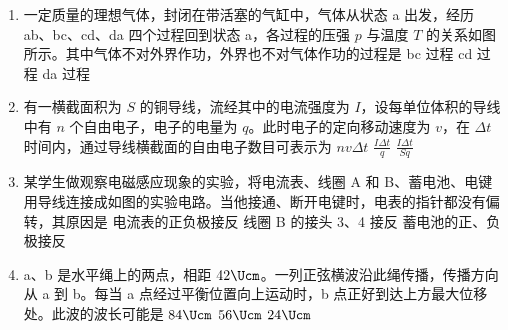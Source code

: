 \documentclass[\gkver]{gaokaozhenti}
\begin{document}
\begin{enumerate}
\item
一定质量的理想气体，封闭在带活塞的气缸中，气体从状态 a 出发，经历 ab、bc、cd、da 四个过程回到状态 a，各过程的压强 $p$ 与温度 $T$ 的关系如图所示。其中气体不对外界作功，外界也不对气体作功的过程是
{bc 过程}
{cd 过程}
{da 过程}

\item
有一横截面积为 $S$ 的铜导线，流经其中的电流强度为 $I$，设每单位体积的导线中有 $n$ 个自由电子，电子的电量为 $q$。此时电子的定向移动速度为 $v$，在 $\Delta t$ 时间内，通过导线横截面的自由电子数目可表示为
{$nv\Delta t$}
{$\frac{I\Delta t}{q}$}
{$\frac{I\Delta t}{Sq}$}

\item
某学生做观察电磁感应现象的实验，将电流表、线圈 A 和 B、蓄电池、电键用导线连接成如图的实验电路。当他接通、断开电键时，电表的指针都没有偏转，其原因是
{电流表的正负极接反}
{线圈 B 的接头 3、4 接反}
{蓄电池的正、负极接反}

\item
a、b 是水平绳上的两点，相距 $42\Ucm$。一列正弦横波沿此绳传播，传播方向从 a 到 b。每当 a 点经过平衡位置向上运动时，b 点正好到达上方最大位移处。此波的波长可能是
\fourchoices[answer=CD]
{$168\Ucm$}
{$84\Ucm$}
{$56\Ucm$}
{$24\Ucm$}


\end{enumerate}
\end{document}
